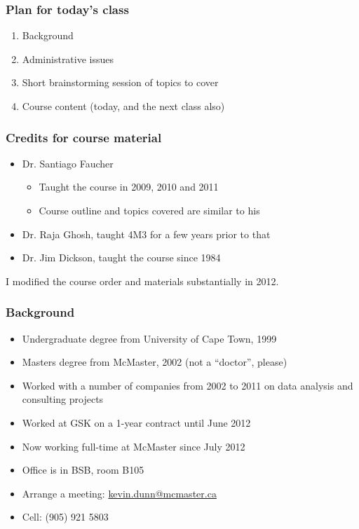 
\begin{frame}\frametitle{Plan for today's class}
	\begin{enumerate}
		\item	Background
		\item	Administrative issues
		\item	Short brainstorming session of topics to cover
		\item	Course content (today, and the next class also)
	\end{enumerate}
\end{frame}

\begin{frame}\frametitle{Credits for course material}

	\begin{itemize}
		\item	Dr. Santiago Faucher
		\begin{itemize}
			\item	Taught the course in 2009, 2010 and 2011
			\item	Course outline and topics covered are similar to his
		\end{itemize}
		\item	Dr. Raja Ghosh, taught 4M3 for a few years prior to that
		\item	Dr. Jim Dickson, taught the course since 1984
	\end{itemize}
	
	\vspace{12pt}
	I modified the course order and materials substantially in 2012. {\color{purple}{You are class number 2}}
\end{frame}

\begin{frame}\frametitle{Background}
	{\color{myGreen}{About myself}}
	\begin{itemize}
		\item	Undergraduate degree from University of Cape Town, 1999
		\item	Masters degree from McMaster, 2002 (not a ``doctor'', please)
		\item	Worked with a number of companies from 2002 to 2011 on data analysis and consulting projects
		\item	Worked at GSK on a 1-year contract until June 2012
		\item	Now working full-time at McMaster since July 2012
		\item	Office is in BSB, room B105
		\item	Arrange a meeting: \url{kevin.dunn@mcmaster.ca}
		\item	Cell: (905) 921 5803
	\end{itemize}
\end{frame}

